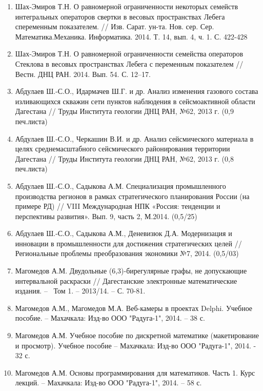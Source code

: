 \documentclass{article}
\begin{document}
\begin{enumerate}
\item  Шах-Эмиров Т.Н. О равномерной ограниченности некоторых семейств интегральных операторов свертки в весовых пространствах Лебега спеременным показателем. // Изв. Сарат. ун-та. Нов. сер. Сер. Математика.Механика. Информатика. 2014. Т. 14, вып. 4, ч. 1. С. 422-428

\item  Шах-Эмиров Т.Н. О равномерной ограниченности семейства операторов Стеклова в весовых пространствах Лебега с переменным показателем // Вестн. ДНЦ РАН. 2014. Вып. 54. С. 12--17.

\item  Абдулаев Ш.-С.О., Идармачев Ш.Г. и др. Анализ изменения газового состава изливающихся скважин сети пунктов наблюдения в сейсмоактивной области Дагестана // Труды Института геологии ДНЦ РАН, №62, 2013 г. (0,9 печ.листа)

\item  Абдулаев Ш.-С.О., Черкашин В.И. и др. Анализ сейсмического материала в целях среднемасштабного сейсмического районирования территории Дагестана // Труды Института геологии ДНЦ РАН, №62, 2013 г. (0,8 печ.листа)

\item  Абдулаев Ш.-С.О., Садыкова А.М. Специализация промышленного производства регионов в рамках стратегического планирования России (на примере РД) // VIII Международная НПК «Россия: тенденции и перспективы развития». Вып. 9, часть 2, М.2014. (0,5/25)

\item  Абдулаев Ш.-С.О., Садыкова А.М., Деневизюк Д.А. Модернизация и инновации в промышленности для достижения стратегических целей // Региональные проблемы преобразования экономики №7, 2014. (0,5/03)

\item  Магомедов А.М. Двудольные (6,3)-бирегулярные графы, не допускающие интервальной раскраски // Дагестанские электронные математические издания. --  ~Том 1. -- 2013/14. -- С. 70-81.

\item  Магомедов А.М., Магомедов М.А. Веб-камеры в проектах Delphi. Учебное пособие. -- Махачкала: Изд-во ООО "Радуга-1", 2014. -- 38 с.

\item  Магомедов А.М. Учебное пособие по дискретной математике (макетирование и просмотр). Учебное пособие -- Махачкала: Изд-во ООО "Радуга-1", 2014. - 32 с.

\item  Магомедов А.М. Основы программирования для математиков. Часть 1. Курс лекций. -- Махачкала: Изд-во ООО "Радуга-1", 2014. -- 58 с.
\end{enumerate}
\end{document}
